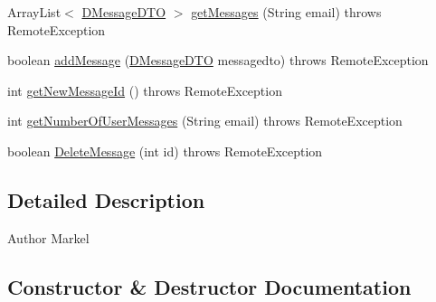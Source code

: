 \begin{DoxyCompactItemize}
\item 
Array\+List$<$ \mbox{\hyperlink{classes_1_1deusto_1_1bspq18_1_1e6_1_1_deusto_box_1_1_server_1_1dto_1_1_d_message_d_t_o}{D\+Message\+D\+TO}} $>$ \mbox{\hyperlink{classes_1_1deusto_1_1bspq18_1_1e6_1_1_deusto_box_1_1_server_1_1remote_1_1_deusto_box_remote_service_ad01c937c994fae0630402d05bc99496a}{get\+Messages}} (String email)  throws Remote\+Exception 
\item 
boolean \mbox{\hyperlink{classes_1_1deusto_1_1bspq18_1_1e6_1_1_deusto_box_1_1_server_1_1remote_1_1_deusto_box_remote_service_a107c5402a09f6de5482dd66967751439}{add\+Message}} (\mbox{\hyperlink{classes_1_1deusto_1_1bspq18_1_1e6_1_1_deusto_box_1_1_server_1_1dto_1_1_d_message_d_t_o}{D\+Message\+D\+TO}} messagedto)  throws Remote\+Exception 
\item 
int \mbox{\hyperlink{classes_1_1deusto_1_1bspq18_1_1e6_1_1_deusto_box_1_1_server_1_1remote_1_1_deusto_box_remote_service_ae5002c8513876aae8e9e098e97819696}{get\+New\+Message\+Id}} ()  throws Remote\+Exception 
\item 
int \mbox{\hyperlink{classes_1_1deusto_1_1bspq18_1_1e6_1_1_deusto_box_1_1_server_1_1remote_1_1_deusto_box_remote_service_a52c001ee4b0b93a416778e4b662da841}{get\+Number\+Of\+User\+Messages}} (String email)  throws Remote\+Exception 
\item 
boolean \mbox{\hyperlink{classes_1_1deusto_1_1bspq18_1_1e6_1_1_deusto_box_1_1_server_1_1remote_1_1_deusto_box_remote_service_a1a954b90d573a76975631a924ed1601c}{Delete\+Message}} (int id)  throws Remote\+Exception 
\end{DoxyCompactItemize}


\subsection{Detailed Description}
\begin{DoxyAuthor}{Author}
Markel 
\end{DoxyAuthor}


\subsection{Constructor \& Destructor Documentation}
\mbox{\label{classes_1_1deusto_1_1bspq18_1_1e6_1_1_deusto_box_1_1_server_1_1remote_1_1_deusto_box_remote_service_a84ef229a1ca942909895d1de2dbe0453}} 
